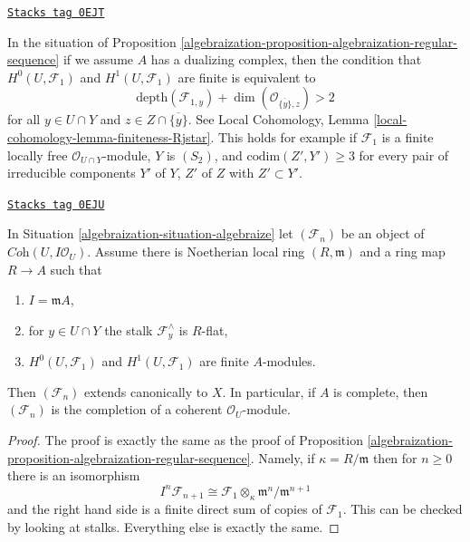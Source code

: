\begin{remark}
\label{algebraization-remark-interesting-case-ter}
\href{https://stacks.math.columbia.edu/tag/0EJT}{\texttt{Stacks tag 0EJT}}

In the situation of
Proposition \ref{algebraization-proposition-algebraization-regular-sequence}
if we assume $A$ has a dualizing complex, then
the condition that $H^0(U, \mathcal{F}_1)$ and
$H^1(U, \mathcal{F}_1)$ are finite is equivalent to
$$
\text{depth}(\mathcal{F}_{1, y}) +
\dim(\mathcal{O}_{\overline{\{y\}}, z}) > 2
$$
for all $y \in U \cap Y$ and $z \in Z \cap \overline{\{y\}}$.
See Local Cohomology, Lemma \ref{local-cohomology-lemma-finiteness-Rjstar}.
This holds for example if $\mathcal{F}_1$ is a finite locally free
$\mathcal{O}_{U \cap Y}$-module, $Y$ is $(S_2)$, and
$\text{codim}(Z', Y') \geq 3$ for every pair of irreducible components
$Y'$ of $Y$, $Z'$ of $Z$ with $Z' \subset Y'$.
\end{remark}

\begin{proposition}
\label{algebraization-proposition-algebraization-flat}
\href{https://stacks.math.columbia.edu/tag/0EJU}{\texttt{Stacks tag 0EJU}}

In Situation \ref{algebraization-situation-algebraize} let
$(\mathcal{F}_n)$ be an object of $\textit{Coh}(U, I\mathcal{O}_U)$.
Assume there is Noetherian local ring $(R, \mathfrak m)$ and a ring
map $R \to A$ such that
\begin{enumerate}
\item $I = \mathfrak m A$,
\item for $y \in U \cap Y$ the stalk $\mathcal{F}_y^\wedge$ is $R$-flat,
\item $H^0(U, \mathcal{F}_1)$ and $H^1(U, \mathcal{F}_1)$ are finite
$A$-modules.
\end{enumerate}
Then $(\mathcal{F}_n)$ extends canonically to $X$. In particular, if $A$
is complete, then $(\mathcal{F}_n)$ is the completion of a coherent
$\mathcal{O}_U$-module.
\end{proposition}

\begin{proof}

The proof is exactly the same as the proof of
Proposition \ref{algebraization-proposition-algebraization-regular-sequence}.
Namely, if $\kappa = R/\mathfrak m$ then for $n \geq 0$
there is an isomorphism
$$
I^n \mathcal{F}_{n + 1} \cong
\mathcal{F}_1 \otimes_\kappa \mathfrak m^n/\mathfrak m^{n + 1}
$$
and the right hand side is a finite direct sum of copies
of $\mathcal{F}_1$. This can be checked by looking at stalks.
Everything else is exactly the same.
\end{proof}

